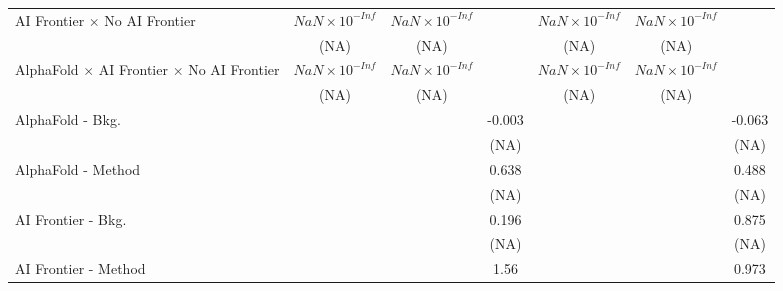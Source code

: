 \begin{tabular}{lcccccc}
   AI Frontier $\times$ No AI Frontier                                        & $NaN\times 10^{-Inf}$  & $NaN\times 10^{-Inf}$  &                        & $NaN\times 10^{-Inf}$  & $NaN\times 10^{-Inf}$  &   \\   
                                                                              & (NA)                   & (NA)                   &                        & (NA)                   & (NA)                   &   \\   
   AlphaFold $\times$ AI Frontier $\times$ No AI Frontier                     & $NaN\times 10^{-Inf}$  & $NaN\times 10^{-Inf}$  &                        & $NaN\times 10^{-Inf}$  & $NaN\times 10^{-Inf}$  &   \\   
                                                                              & (NA)                   & (NA)                   &                        & (NA)                   & (NA)                   &   \\   
   AlphaFold - Bkg.                                                           &                        &                        & -0.003                 &                        &                        & -0.063\\   
                                                                              &                        &                        & (NA)                   &                        &                        & (NA)\\   
   AlphaFold - Method                                                         &                        &                        & 0.638                  &                        &                        & 0.488\\   
                                                                              &                        &                        & (NA)                   &                        &                        & (NA)\\   
   AI Frontier - Bkg.                                                         &                        &                        & 0.196                  &                        &                        & 0.875\\   
                                                                              &                        &                        & (NA)                   &                        &                        & (NA)\\   
   AI Frontier - Method                                                       &                        &                        & 1.56                   &                        &                        & 0.973\\   

\end{tabular}
